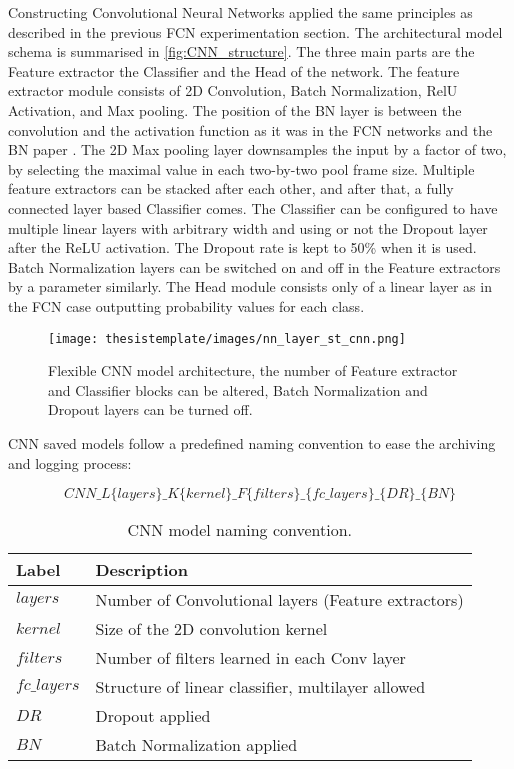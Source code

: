 Constructing Convolutional Neural Networks applied the same principles as described in the previous FCN experimentation section. The architectural model schema is summarised in \autoref{fig:CNN_structure}. The three main parts are the Feature extractor the Classifier and the Head of the network. The feature extractor module consists of 2D Convolution, Batch Normalization, RelU Activation, and Max pooling. The position of the BN layer is between the convolution and the activation function as it was in the FCN networks and the BN paper \cite{ioffe2015batch}. The 2D Max pooling layer downsamples the input by a factor of two, by selecting the maximal value in each two-by-two pool frame size. Multiple feature extractors can be stacked after each other, and after that, a fully connected layer based Classifier comes. The Classifier can be configured to have multiple linear layers with arbitrary width and using or not the Dropout layer after the ReLU activation. The Dropout rate is kept to 50\% when it is used. Batch Normalization layers can be switched on and off in the Feature extractors by a parameter similarly. The Head module consists only of a linear layer as in the FCN case outputting probability values for each class.

\vspace{100px}

\begin{figure}[h!]
  \begin{center}
    \texttt{[image: thesistemplate/images/nn\_layer\_st\_cnn.png]}
    \caption{Flexible CNN model architecture, the number of Feature extractor and Classifier blocks can be altered, Batch Normalization and Dropout layers can be turned off.}
    \label{fig:CNN_structure}
  \end{center}
\end{figure}

CNN saved models follow a predefined naming convention to ease the archiving and logging process:

\begin{equation*}
CNN\_L\{layers\}\_K\{kernel\}\_F\{filters\}\_\{fc\_layers\}\_\{DR\}\_\{BN\}
\end{equation*}

\begin{table}[h!]
\begin{tabular}{l|l}
\textbf{Label}      & \textbf{Description}  \\
\hline
$layers$     & Number of Convolutional layers (Feature extractors) \\
$kernel$     & Size of the 2D convolution kernel \\
$filters$    & Number of filters learned in each Conv layer     \\
$fc\_layers$ & Structure of linear classifier, multilayer allowed \\
$DR$         & Dropout applied           \\
$BN$         & Batch Normalization applied           
\end{tabular}
\caption{CNN model naming convention.}
\end{table}

